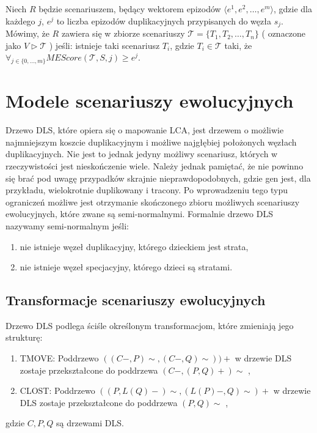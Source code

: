 \documentclass[licencjacka]{pracamgr}
\begin{document}
Niech $R$ będzie scenariuszem, będący wektorem epizodów $\langle e^1,e^2, \dots , e^m \rangle$, gdzie dla każdego $j$, $e^j$ to liczba epizodów duplikacyjnych przypisanych do węzła $s_j$. Mówimy, że $R$ zawiera się w zbiorze scenariuszy $\mathcal{T}=\{T_1,T_2, \dots , T_n\}$ ( oznaczone jako $V \triangleright \mathcal{T}$ ) jeśli: istnieje  taki scenariusz $T_i$, gdzie ${T_i \in \mathcal{T}}$ taki, że $\forall_{j \in \{0,\dots,m\}}MEScore(\mathcal{T},S,j) \geq e^j$.




\section{Modele scenariuszy ewolucyjnych}

Drzewo DLS, które opiera się o mapowanie LCA, jest drzewem o możliwie najmniejszym koszcie duplikacyjnym i możliwe najgłębiej położonych węzłach duplikacyjnych. Nie jest to jednak jedyny możliwy scenariusz, których w rzeczywistości jest nieskończenie wiele. Należy jednak pamiętać, że nie powinno się brać pod uwagę przypadków skrajnie nieprawdopodobnych, gdzie gen jest, dla przykładu, wielokrotnie duplikowany i tracony. Po wprowadzeniu tego typu ograniczeń możliwe jest otrzymanie skończonego zbioru możliwych scenariuszy ewolucyjnych, które zwane są semi-normalnymi. Formalnie drzewo DLS nazywamy semi-normalnym jeśli:
\begin{enumerate}
\item nie istnieje węzeł duplikacyjny, którego dzieckiem jest strata,
\item nie istnieje węzeł specjacyjny, którego dzieci są stratami.
\end{enumerate}


\subsection{Transformacje scenariuszy ewolucyjnych}

Drzewo DLS podlega ściśle określonym transformacjom, które zmieniają jego strukturę: 
\begin{enumerate}
\item TMOVE: Poddrzewo $((C-,P)\sim,(C-,Q)\sim))+$ w drzewie DLS zostaje przekształcone do poddrzewa $(C-,(P,Q)+)\sim $ ,
\item CLOST: Poddrzewo $((P,L(Q)-)\sim,(L(P)-,Q)\sim)+$ w drzewie DLS zostaje przekształcone do poddrzewa   $(P,Q)\sim $ ,
\end{enumerate}
gdzie $C,P,Q$ są drzewami DLS.
\end{document}
